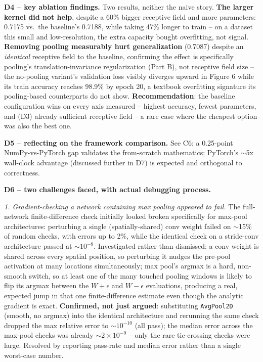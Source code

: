 \documentclass[11pt,a4paper]{article}
\begin{document}
\textbf{D4 -- key ablation findings.} Two results, neither the naive story. \textbf{The
larger kernel did not help}, despite a 60\% bigger receptive field and more parameters:
0.7175 vs.\ the baseline's 0.7188, while taking 47\% longer to train -- on a dataset this
small and low-resolution, the extra capacity bought overfitting, not signal.
\textbf{Removing pooling measurably hurt generalization} (0.7087) despite an
\emph{identical} receptive field to the baseline, confirming the effect is specifically
pooling's translation-invariance regularization (Part B), not receptive field size -- the
no-pooling variant's validation loss visibly diverges upward in Figure 6 while its train
accuracy reaches 98.9\% by epoch 20, a textbook overfitting signature its pooling-based
counterparts do not show. \textbf{Recommendation}: the baseline configuration wins on every
axis measured -- highest accuracy, fewest parameters, and (D3) already sufficient
receptive field -- a rare case where the cheapest option was also the best one.

\textbf{D5 -- reflecting on the framework comparison.} See C6: a 0.25-point NumPy-vs-PyTorch
gap validates the from-scratch mathematics; PyTorch's $\sim$5x wall-clock advantage
(discussed further in D7) is expected and orthogonal to correctness.

\textbf{D6 -- two challenges faced, with actual debugging process.}

\emph{1. Gradient-checking a network containing max pooling appeared to fail.} The
full-network finite-difference check initially looked broken specifically for max-pool
architectures: perturbing a single (spatially-shared) conv weight failed on $\sim$15\% of
random checks, with errors up to 2\%, while the identical check on a stride-conv
architecture passed at $\sim10^{-8}$. Investigated rather than dismissed: a conv weight is
shared across every spatial position, so perturbing it nudges the pre-pool activation at
many locations simultaneously; max pool's argmax is a hard, non-smooth switch, so at least
one of the many touched pooling windows is likely to flip its argmax between the $W+\epsilon$
and $W-\epsilon$ evaluations, producing a real, expected jump in that one finite-difference
estimate even though the analytic gradient is exact. \textbf{Confirmed, not just argued}:
substituting \texttt{AvgPool2D} (smooth, no argmax) into the identical architecture and
rerunning the same check dropped the max relative error to $\sim10^{-10}$ (all pass); the
median error across the max-pool checks was already $\sim2\times10^{-9}$ -- only the rare
tie-crossing checks were large. Resolved by reporting pass-rate and median error rather than
a single worst-case number.
\end{document}
